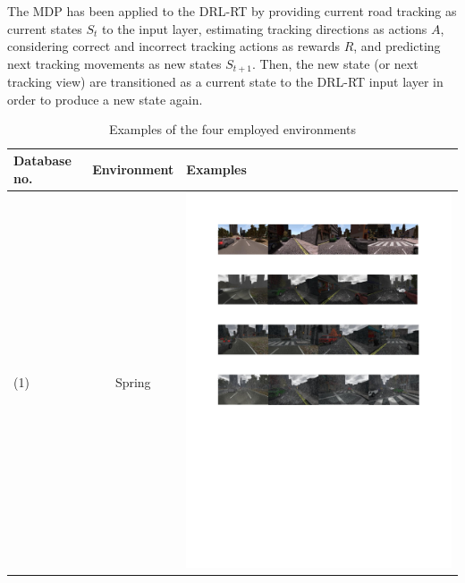 The MDP has been applied to the DRL-RT by providing current road tracking as current states $S_t$ to the input layer, estimating tracking directions as actions $A$, considering correct and incorrect tracking actions as rewards $R$, and predicting next tracking movements as new states $S_{t+1}$. Then, the new state (or next tracking view) are transitioned as a current state to the DRL-RT input layer in order to produce a new state again.
\begin{table}[!t]
	\centering
	\caption{Examples of the four employed environments}
	\label{Table:Environments_Examples}
	\begin{tabular}{|C{1cm}|c|C{13.5cm}|}
		\hline
		\textbf{Database no.} & \textbf{Environment} & \textbf{Examples} \\ \hline
		(1)	& Spring & \begin{minipage}{.9\textwidth}\includegraphics[scale=.8,trim=2cm 24.5cm 2cm 2.5cm,clip]{examples.pdf}\end{minipage} \\ \hline

\end{tabular}
\end{table}
